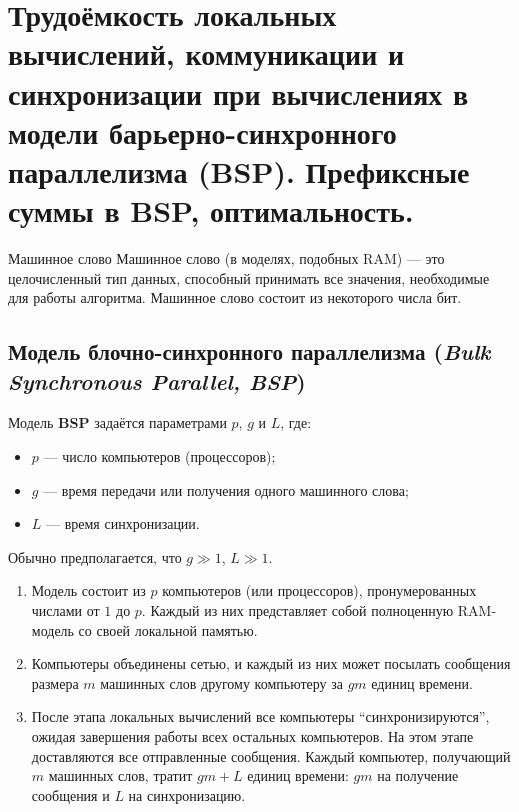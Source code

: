 
\section{Трудоёмкость локальных вычислений, коммуникации и синхронизации
	при вычислениях в модели барьерно-синхронного параллелизма (BSP).
	Префиксные суммы в BSP, оптимальность.}

\begin{Definition}{Машинное слово}{}
	Машинное слово (в моделях, подобных RAM) --- это целочисленный тип данных, способный принимать все значения, необходимые для работы алгоритма.
	Машинное слово состоит из некоторого числа бит.
\end{Definition}

\subsection{Модель блочно-синхронного параллелизма (\emph{Bulk Synchronous Parallel, BSP})}

Модель \textbf{BSP} задаётся параметрами \(p\), \(g\) и \(L\), где:
\begin{itemize}
	\item \(p\) --- число компьютеров (процессоров);
	\item \(g\) --- время передачи или получения одного машинного слова;
	\item \(L\) --- время синхронизации.
\end{itemize}

Обычно предполагается, что \(g \gg 1\), \(L \gg 1\).

\begin{enumerate}
	\item Модель состоит из \(p\) компьютеров (или процессоров), пронумерованных числами от \(1\) до \(p\).
	Каждый из них представляет собой полноценную RAM-модель со своей локальной памятью.
	
	\item Компьютеры объединены сетью, и каждый из них может посылать сообщения размера \(m\) машинных слов другому компьютеру за \(gm\) единиц времени.
	
	\item После этапа локальных вычислений все компьютеры
	``синхронизируются'', ожидая завершения работы всех остальных
	компьютеров. На этом этапе доставляются все отправленные сообщения.
	Каждый компьютер, получающий \(m\) машинных слов, тратит \(gm + L\)
	единиц времени: \(gm\) на получение сообщения и \(L\) на синхронизацию.
\end{enumerate}

